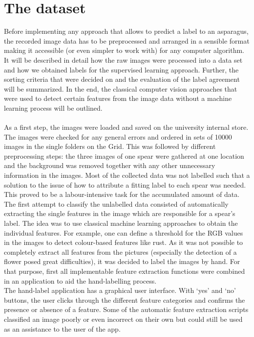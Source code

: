 \section{The dataset}

Before implementing any approach that allows to predict a label to an asparagus, the recorded image data has to be preprocessed and arranged in a sensible format making it accessible (or even simpler to work with) for any computer algorithm.
It will be described in detail how the raw images were processed into a data set and how we obtained labels for the supervised learning approach. Further, the sorting criteria that were decided on and the evaluation of the label agreement will be summarized. In the end, the classical computer vision approaches that were used to detect certain features from the image data without a machine learning process will be outlined. \\
\\
As a first step, the images were loaded and saved on the university internal store. The images were checked for any general errors and ordered in sets of 10000 images in the single folders on the Grid.
This was followed by different preprocessing steps: the three images of one spear were gathered at one location and the background was removed together with any other unnecessary information in the images. Most of the collected data was not labelled such that a solution to the issue of how to attribute a fitting label to each spear was needed. This proved to be a labour-intensive task for the accumulated amount of data.
The first attempt to classify the unlabelled data consisted of automatically extracting the single features in the image which are responsible for a spear’s label. The idea was to use classical machine learning approaches to obtain the individual features. For example, one can define a threshold for the RGB values in the images to detect colour-based features like rust. As it was not possible to completely extract all features from the pictures (especially the detection of a flower posed great difficulties), it was decided to label the images by hand. For that purpose, first all implementable feature extraction functions were combined in an application to aid the hand-labelling process. \\
The hand-label application has a graphical user interface. With ‘yes’ and ‘no’ buttons, the user clicks through the different feature categories and confirms the presence or absence of a feature. Some of the automatic feature extraction scripts classified an image poorly or even incorrect on their own but could still be used as an assistance to the user of the app. \\
